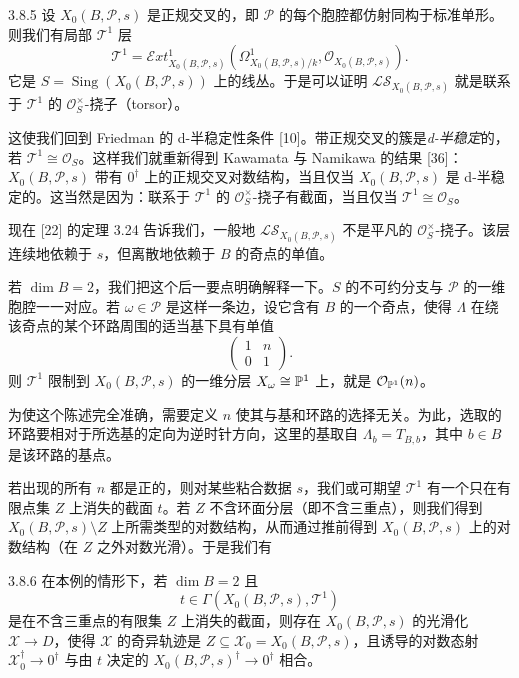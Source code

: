 \begin{example}{3.8.5}
设 $X_0(B,\mathcal P,s)$ 是正规交叉的，即 $\mathcal P$ 的每个胞腔都仿射同构于标准单形。则我们有局部 $\mathcal T^1$ 层
\[
\mathcal T^1=\mathcal Ext^1_{X_0(B,\mathcal P,s)}(\Omega^1_{X_0(B,\mathcal P,s)/k},\mathcal O_{X_0(B,\mathcal P,s)}).
\]
它是 $S=\operatorname{Sing}(X_0(B,\mathcal P,s))$ 上的线丛。于是可以证明 $\mathcal{LS}_{X_0(B,\mathcal P,s)}$ 就是联系于 $\mathcal T^1$ 的 $\mathcal O_S^\times$-挠子（torsor）。
\end{example}

这使我们回到 Friedman 的 d-半稳定性条件 [10]。带正规交叉的簇是\emph{d-半稳定}的，若 $\mathcal T^1\cong\mathcal O_S$。这样我们就重新得到 Kawamata 与 Namikawa 的结果 [36]：$X_0(B,\mathcal P,s)$ 带有 $0^\dagger$ 上的正规交叉对数结构，当且仅当 $X_0(B,\mathcal P,s)$ 是 d-半稳定的。这当然是因为：联系于 $\mathcal T^1$ 的 $\mathcal O_S^\times$-挠子有截面，当且仅当 $\mathcal T^1\cong\mathcal O_S$。

现在 [22] 的定理 3.24 告诉我们，一般地 $\mathcal{LS}_{X_0(B,\mathcal P,s)}$ 不是平凡的 $\mathcal O_S^\times$-挠子。该层连续地依赖于 $s$，但离散地依赖于 $B$ 的奇点的单值。

若 $\dim B=2$，我们把这个后一要点明确解释一下。$S$ 的不可约分支与 $\mathcal P$ 的一维胞腔一一对应。若 $\omega\in\mathcal P$ 是这样一条边，设它含有 $B$ 的一个奇点，使得 $\Lambda$ 在绕该奇点的某个环路周围的适当基下具有单值
\[
\begin{pmatrix}1&n\\0&1\end{pmatrix}.
\]
则 $\mathcal T^1$ 限制到 $X_0(B,\mathcal P,s)$ 的一维分层 $X_\omega\cong\mathbb{P}^1$ 上，就是 $\mathcal O_{\mathbb{P}^1}(n)$。

为使这个陈述完全准确，需要定义 $n$ 使其与基和环路的选择无关。为此，选取的环路要相对于所选基的定向为逆时针方向，这里的基取自 $\Lambda_b=T_{B,b}$，其中 $b\in B$ 是该环路的基点。

若出现的所有 $n$ 都是正的，则对某些粘合数据 $s$，我们或可期望 $\mathcal T^1$ 有一个只在有限点集 $Z$ 上消失的截面 $t$。若 $Z$ 不含环面分层（即不含三重点），则我们得到 $X_0(B,\mathcal P,s)\setminus Z$ 上所需类型的对数结构，从而通过推前得到 $X_0(B,\mathcal P,s)$ 上的对数结构（在 $Z$ 之外对数光滑）。于是我们有

\begin{proposition}{3.8.6}
在本例的情形下，若 $\dim B=2$ 且
\[
t\in\Gamma(X_0(B,\mathcal P,s),\mathcal T^1)
\]
是在不含三重点的有限集 $Z$ 上消失的截面，则存在 $X_0(B,\mathcal P,s)$ 的光滑化 $\mathcal X\to D$，使得 $\mathcal X$ 的奇异轨迹是 $Z\subseteq\mathcal X_0=X_0(B,\mathcal P,s)$，且诱导的对数态射 $\mathcal X_0^\dagger\to0^\dagger$ 与由 $t$ 决定的 $X_0(B,\mathcal P,s)^\dagger\to0^\dagger$ 相合。
\end{proposition}

